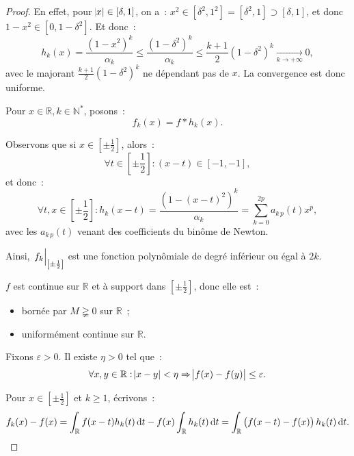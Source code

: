 \documentclass{report}
\theoremstyle{definition}
\theoremstyle{remark}
\numberwithin{equation}{section}
\newcommand{\R}{\mathbb R}
\newcommand{\N}{\mathbb N}
\newcommand{\Ns}{\N^{*}}
\newcommand{\restr}[2]{\left.#1\vphantom{\big|}\right|_{#2}}
\newcommand{\pinfty}{{+\infty}}
\begin{document}
\begin{proof}
			En effet, pour $\abs x \in [\delta, 1]$, on a~: $x^2 \in [\delta^2, 1^2] = [\delta^2, 1] \supset [\delta, 1]$, et donc $1-x^2 \in [0, 1-\delta^2]$.
			Et donc~:
			\begin{equation}
				h_k(x) = \frac {(1-x^2)^k}{\alpha_k} \leq \frac {(1-\delta^2)^k}{\alpha_k} \leq \frac {k+1}2(1-\delta^2)^k \xrightarrow[k \to \pinfty]{} 0,
			\end{equation}
			avec le majorant $\frac {k+1}2(1-\delta^2)^k$ ne dépendant pas de $x$. La convergence est donc uniforme.

			Pour $x \in \R, k \in \Ns$, posons~:
			\begin{equation}
				f_k(x) = f * h_k(x).
			\end{equation}

			Observons que si $x \in \left[\pm \frac 12\right]$, alors~:
			\begin{equation}
				\forall t \in \left[\pm \frac 12\right] : (x-t) \in [-1, -1],
			\end{equation}
			et donc~:
			\begin{equation}
				\forall t, x \in \left[\pm \frac 12\right] : h_k(x-t) = \frac {{(1-(x-t)^2)}^k}{\alpha_k} = \sum_{k=0}^{2p}a_{k\,p}(t)x^p,
			\end{equation}
			avec les $a_{k\,p}(t)$ venant des coefficients du binôme de Newton.

			Ainsi, $\restr {f_k}{\left[\pm\frac 12\right]}$ est une fonction polynômiale de degré inférieur ou égal à $2k$.

			$f$ est continue sur $\R$ et à support dans $\left[\pm \frac 12\right]$, donc elle est~:
			\begin{itemize}
				\item bornée par $M \gneqq 0$ sur $\R$~;
				\item uniformément continue sur $\R$\footnotemark.
			\end{itemize}

			Fixons $\varepsilon > 0$. Il existe $\eta > 0$ tel que~:
			\begin{equation}
				\forall x, y \in \R : \abs {x-y} < \eta \Rightarrow \abs {f(x)-f(y)} \leq \varepsilon.
			\end{equation}

			Pour $x \in \left[\pm\frac 12\right]$ et $k \geq 1$, écrivons~:
			\begin{equation}
				f_k(x)-f(x) = \int_\R f(x-t)h_k(t)\dif t - f(x)\int_\R h_k(t)\dif t = \int_\R \left(f(x-t)-f(x)\right)h_k(t)\dif t.
			\end{equation}


\end{proof}
\end{document}
